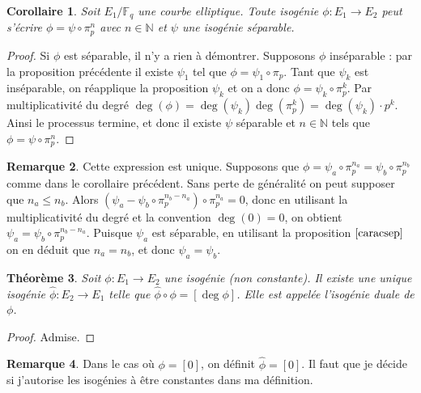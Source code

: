 \documentclass{article}
\theoremstyle{plain}%
\newtheorem{thm}{Théorème}[section]
\newtheorem{cor}[thm]{Corollaire}
\theoremstyle{definition}%
\newtheorem{rem}[thm]{Remarque}
\newcommand{\F}{\mathbb{F}}
\newcommand{\N}{\mathbb{N}}
\newcommand{\h}{\widehat}
\begin{document}
\begin{cor}
  Soit $E_1/\F_q$ une courbe elliptique. Toute isogénie $\phi : E_1 \to E_2 $ peut s'écrire $\phi = \psi \circ \pi_p^n$ avec $n\in \N$ et $\psi$ une isogénie séparable.
\end{cor}

\begin{proof}
  Si $\phi$ est séparable, il n'y a rien à démontrer. Supposons $\phi$ inséparable : par la proposition précédente il existe $\psi_1$ tel que $\phi = \psi_1 \circ \pi_p$. Tant que $\psi_k$ est inséparable, on réapplique la proposition $\psi_k$ et on a donc $\phi = \psi_k \circ \pi_p^k$. 
  Par multiplicativité du degré $\deg(\phi) = \deg(\psi_k)\deg(\pi_p^k) = \deg(\psi_k)\cdot p^k$.
  Ainsi le processus termine, et donc il existe $\psi$ séparable et $n\in \N$ tels que $\phi = \psi \circ \pi_p^n$.
\end{proof}

\begin{rem}
  Cette expression est unique. Supposons que $\phi = \psi_a \circ \pi_p^{n_a} = \psi_b \circ \pi_p^{n_b}$ comme dans le corollaire précédent. Sans perte de généralité on peut supposer que $n_a \le n_b$. Alors $(\psi_a - \psi_b \circ \pi_p^{n_b - n_a}) \circ \pi_p^{n_a} = 0$, donc en utilisant la multiplicativité du degré et la convention $\deg(0) = 0$, on obtient $\psi_a = \psi_b \circ \pi_p^{n_b - n_a}$. Puisque $\psi_a$ est séparable, en utilisant la proposition $\ref{caracsep}$ on en déduit que $n_a = n_b$, et donc $\psi_a = \psi_b$.
\end{rem}

\begin{thm}
  \label{existence_duale}
  Soit $\phi : E_1\to E_2$ une isogénie (non constante). Il existe une unique isogénie $\h\phi : E_2\to E_1$ telle que $\h\phi \circ \phi = [\deg\phi]$. Elle est appelée l'isogénie duale de $\phi$.
\end{thm}

\begin{proof}
  Admise. 
\end{proof}

\begin{rem}
  Dans le cas où $\phi = [0]$, on définit $\h\phi = [0]$. {\color{red} Il faut que je décide si j'autorise les isogénies à être constantes dans ma définition}.
\end{rem}
\end{document}
